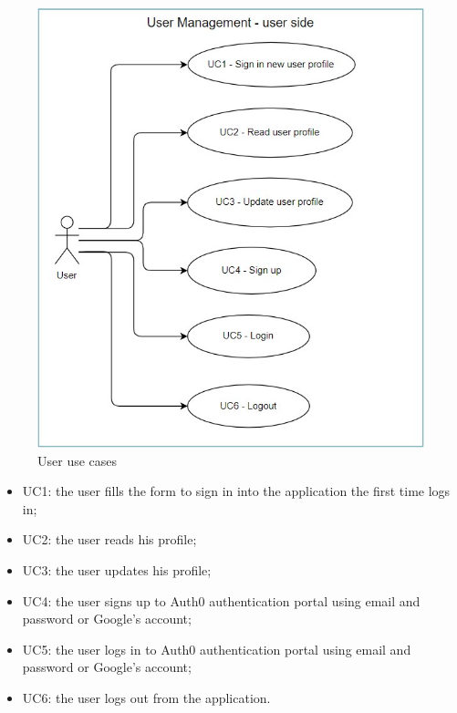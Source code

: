 \begin{figure} [H]
	\centering
	\includegraphics[scale=1.2]{../Img/UC_user}
	\caption{User use cases}\label{}
\end{figure}

\begin{itemize}
	\item UC1: the user fills the form to sign in into the application the first time logs in;
	\item UC2: the user reads his profile;
	\item UC3: the user updates his profile;
	\item UC4: the user signs up to Auth0 authentication portal using email and password or Google's account;
	\item UC5: the user logs in to Auth0 authentication portal using email and password or Google's account;
	\item UC6: the user logs out from the application.
\end{itemize}

